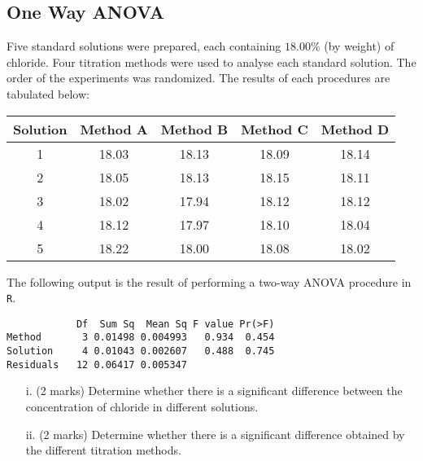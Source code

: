 \documentclass[a4paper,12pt]{article}
\begin{document}
\subsection{One Way ANOVA}
Five standard solutions were prepared, each containing $18.00\%$ (by weight) of chloride. Four titration methods were used to analyse each standard solution. The order of the experiments was randomized. The results of each procedures are tabulated below:
\begin{center}
    \begin{tabular}{|c|c|c|c|c|}
      \hline

      Solution &  Method A & Method B & Method C & Method D \\\hline
1	&	18.03	&	18.13	&	18.09	&	18.14	\\
2	&	18.05	&	18.13	&	18.15	&	18.11	\\
3	&	18.02	&	17.94	&	18.12	&	18.12	\\
4	&	18.12	&	17.97	&	18.10	&	18.04	\\
5	&	18.22	&	18.00	&	18.08	&	18.02	\\

      \hline
    \end{tabular}
    \end{center}
The following output is the result of performing a two-way ANOVA procedure in \texttt{R}.
\begin{framed}
\begin{verbatim}
            Df  Sum Sq  Mean Sq F value Pr(>F)
Method       3 0.01498 0.004993   0.934  0.454
Solution     4 0.01043 0.002607   0.488  0.745
Residuals   12 0.06417 0.005347
\end{verbatim}
\end{framed}




\begin{itemize}
\item[i.] (2 marks) Determine whether there is a significant difference between the concentration of chloride in different solutions.
\item[ii.] (2 marks) Determine whether there is a  significant difference obtained by the different titration methods.
\end{itemize}
\end{document}
